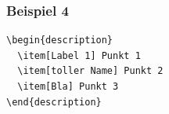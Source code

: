 \begin{frame}[fragile]
\frametitle{Beispiel 4}
\begin{lstlisting}[style=Latex]
\begin{description}
  \item[Label 1] Punkt 1
  \item[toller Name] Punkt 2
  \item[Bla] Punkt 3
\end{description}
\end{lstlisting} \vspace{-20pt}
\pause{}
\end{frame}
